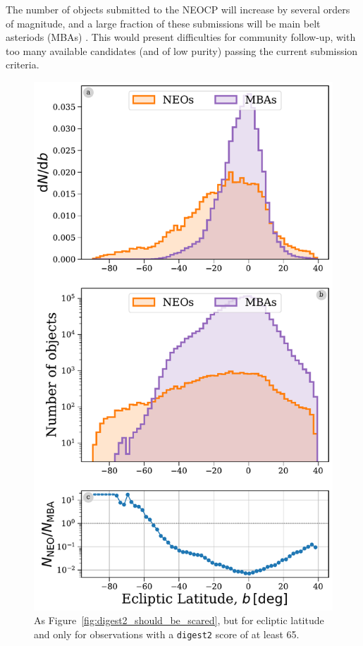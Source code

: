 \documentclass[twocolumn, twocolappendix]{aastex631}
\newcommand{\dig}{\texttt{digest2}}
\begin{document}
The number of objects submitted to the NEOCP will increase by several orders of magnitude, and a large fraction of these submissions will be main belt asteriods (MBAs) \citep{sky-is-falling}. This would present difficulties for community follow-up, with too many available candidates (and of low purity) passing the current submission criteria.

\begin{figure}[htb]
    \centering
    \includegraphics[width=\columnwidth]{figures/ecliptic_latitude_dist_highscore.pdf}
    \caption{As Figure~\ref{fig:digest2_should_be_scared}, but for ecliptic latitude and only for observations with a \dig{} score of at least 65.}
    \label{fig:ecl_lat_highscore}
\end{figure}
\end{document}
